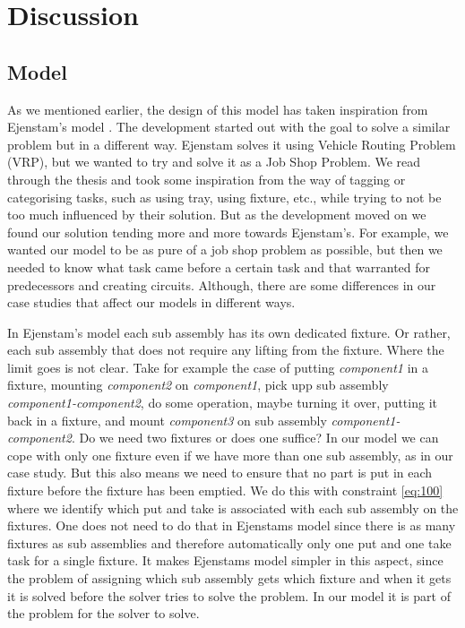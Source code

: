 \chapter{Discussion}\label{cha:discuss}

\section{Model}
As we mentioned earlier, the design of this model has taken inspiration from Ejenstam's model \cite{ejenstam_2014}. The development started out with the goal to solve a similar problem but in a different way. Ejenstam solves it using Vehicle Routing Problem (VRP), but we wanted to try and solve it as a Job Shop Problem. We read through the thesis and took some inspiration from the way of tagging or categorising tasks, such as using tray, using fixture, etc., while trying to not be too much influenced by their solution. But as the development moved on we found our solution tending more and more towards Ejenstam's. For example, we wanted our model to be as pure of a job shop problem as possible, but then we needed to know what task came before a certain task and that warranted for predecessors and creating circuits. Although, there are some differences in our case studies that affect our models in different ways.

In Ejenstam's model each sub assembly has its own dedicated fixture. Or rather, each sub assembly that does not require any lifting from the fixture. Where the limit goes is not clear. Take for example the case of putting \emph{component1} in a fixture, mounting \emph{component2} on \emph{component1}, pick upp sub assembly \emph{component1-component2}, do some operation, maybe turning it over, putting it back in a fixture, and mount \emph{component3} on sub assembly \emph{component1-component2}. Do we need two fixtures or does one suffice? In our model we can cope with only one fixture even if we have more than one sub assembly, as in our case study. But this also means we need to ensure that no part is put in each fixture before the fixture has been emptied. We do this with constraint \ref{eq:100} where we identify which put and take is associated with each sub assembly on the fixtures. One does not need to do that in Ejenstams model since there is as many fixtures as sub assemblies and therefore automatically only one put and one take task for a single fixture. It makes Ejenstams model simpler in this aspect, since the problem of assigning which sub assembly gets which fixture and when it gets it is solved before the solver tries to solve the problem. In our model it is part of the problem for the solver to solve.

